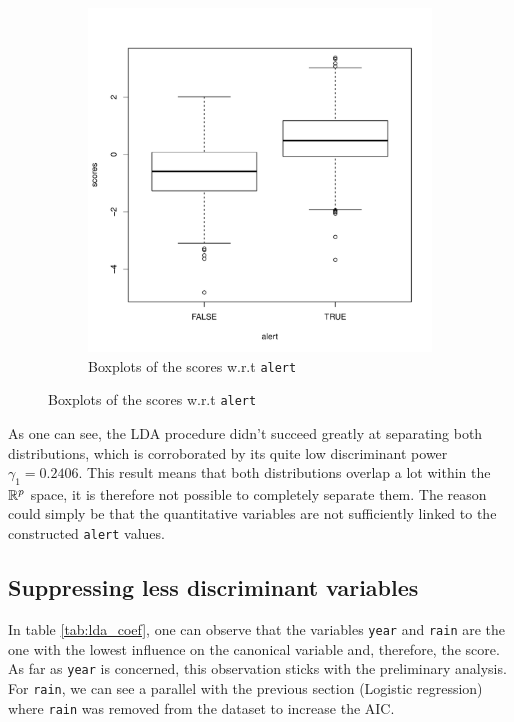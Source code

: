 \documentclass[a4paper, 12pt]{article}
\begin{document}
\begin{figure}[h]
\begin{subfigure}{0.48\textwidth}
            \includegraphics[width=\textwidth]{resources/pdf/lda_full_boxplot.pdf}
            \caption{Boxplots of the scores w.r.t \texttt{alert}}
        \end{subfigure}
    \end{figure}
    
    As one can see, the LDA procedure didn't succeed greatly at separating both distributions, which is corroborated by its quite low discriminant power $\gamma_1 = \num{0.2406}$. This result means that both distributions overlap a lot within the $\mathbb{R}^p$ space, it is therefore not possible to completely separate them. The reason could simply be that the quantitative variables are not sufficiently linked to the constructed \texttt{alert} values.
    
    \subsection{Suppressing less discriminant variables}
    
    In table \ref{tab:lda_coef}, one can observe that the variables \texttt{year} and \texttt{rain} are the one with the lowest influence on the canonical variable and, therefore, the score. As far as \texttt{year} is concerned, this observation sticks with the preliminary analysis. For \texttt{rain}, we can see a parallel with the previous section (Logistic regression) where \texttt{rain} was removed from the dataset to increase the AIC.
    
\end{document}
